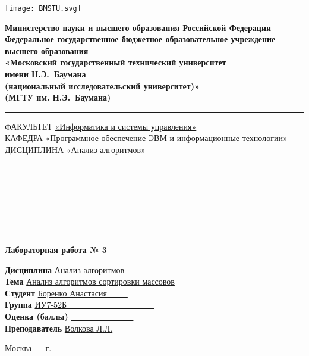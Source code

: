 
\begin{titlepage}
    


    \noindent \begin{minipage}{0.20\textwidth}
        \texttt{[image: BMSTU.svg]}
    \end{minipage}
    \noindent\begin{minipage}{0.8\textwidth}\centering \singlespacing\small
        \textbf{Министерство науки и высшего образования Российской Федерации}\\
        \textbf{Федеральное государственное бюджетное образовательное учреждение высшего образования}\\
        \textbf{«Московский государственный технический университет \\ имени Н.Э.~Баумана}\\
        \textbf{(национальный исследовательский университет)»}\\
        \textbf{(МГТУ им. Н.Э.~Баумана)}
    \end{minipage}
    
    \noindent\rule{18cm}{3pt}


    \begin{flushleft}
    \small{ФАКУЛЬТЕТ \underline{«Информатика и системы управления»}\\    
    КАФЕДРА \underline{«Программное обеспечение ЭВМ и информационные технологии»}}\\
    ДИСЦИПЛИНА \underline{«Анализ алгоритмов»}
    \end{flushleft}

    \
    
    \ 
    
    \ 
    
    \ 
    
    \begin{center}
        \Large\textbf{Лабораторная работа № 3}
    \end{center}


    \begin{flushleft}
        \textbf{Дисциплина} \underline{Анализ алгоритмов}\\
        \textbf{Тема} \underline{Анализ алгоритмов сортировки массовов}\\
        \textbf{Студент} \underline{Боренко Анастасия~~~~~}\\
        \textbf{Группа} \underline{ИУ7-52Б~~~~~~~~~~~~~~~~~~~~~}\\
        \textbf{Оценка (баллы)} \underline{~~~~~~~~~~~~~~~}\\
        \textbf{Преподаватель} \underline{Волкова Л.Л.}
    \end{flushleft}
    
        
    \begin{center}
        \vfill
        Москва --- \the\year г.
    \end{center}

\end{titlepage}

